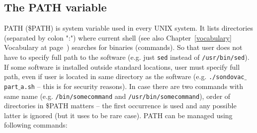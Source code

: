 \documentclass[a4paper, 11pt, twoside]{article}
\begin{document}
\subsection{The PATH variable}

PATH (\$PATH) is system variable used in every UNIX system. It lists directories (separated by colon ":") where current shell (see also Chapter~\ref{vocabulary} Vocabulary at page~\pageref{vocabulary}) searches for binaries (commands). So that user does not have to specify full path to the software (e.g. just \texttt{sed} instead of \texttt{/usr/bin/sed}). If some software is installed outside standard locations, user must specify full path, even if user is located in same directory as the software (e.g. \texttt{./sondovac$\_$part$\_$a.sh} -- this is for security reasons). In case there are two commands with same name (e.g. \texttt{/bin/somecommand} and \texttt{/usr/bin/somecommand}), order of directories in \$PATH matters -- the first occurrence is used and any possible latter is ignored (but it uses to be rare case). PATH can be managed using following commands:

\end{document}
